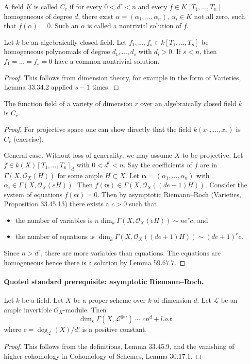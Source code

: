 \begin{definition}[59.67.5]
A field $K$ is called $C_r$ if for every $0<d^r<n$ and every $f\in K[T_1,\ldots,T_n]$ homogeneous of degree $d$, there exist $\alpha=(\alpha_1,\ldots,\alpha_n)$, $\alpha_i\in K$ not all zero, such that $f(\alpha)=0$. Such an $\alpha$ is called a nontrivial solution of $f$.
\end{definition}
\begin{lemma}[59.67.7]
Let $k$ be an algebraically closed field. Let $f_1,\ldots,f_s\in k[T_1,\ldots,T_n]$ be homogeneous polynomials of degree $d_1,\ldots,d_s$ with $d_i>0$. If $s<n$, then $f_1=\ldots=f_s=0$ have a common nontrivial solution.
\end{lemma}
\begin{proof}
This follows from dimension theory, for example in the form of Varieties, Lemma 33.34.2 applied $s-1$ times.
\end{proof}
\begin{theorem}
The function field of a variety of dimension $r$ over an algebraically closed field $k$ is $C_r$.
\end{theorem}
\begin{proof}
For projective space one can show directly that the field $k(x_1,\ldots,x_r)$ is $C_r$ (exercise).

General case. Without loss of generality, we may assume $X$ to be projective. Let $f\in k(X)[T_1,\ldots,T_n]_d$ with $0<d^r<n$. Say the coefficients of $f$ are in $\Gamma(X,\mathcal O_X(H))$ for some ample $H\subset X$. Let $\boldsymbol\alpha=(\alpha_1,\ldots,\alpha_n)$ with $\alpha_i\in\Gamma(X,\mathcal O_X(eH))$. Then $f(\boldsymbol\alpha)\in\Gamma(X,\mathcal O_X((de+1)H))$. Consider the system of equations $f(\boldsymbol\alpha)=0$. Then by asymptotic Riemann--Roch (Varieties, Proposition 33.45.13) there exists a $c>0$ such that
\begin{itemize}
\item the number of variables is $n\dim_k\Gamma(X,\mathcal O_X(eH))\sim ne^rc$, and
\item the number of equations is $\dim_k\Gamma(X,\mathcal O_X((de+1)H))\sim(de+1)^rc$.
\end{itemize}
Since $n>d^r$, there are more variables than equations. The equations are homogeneous hence there is a solution by Lemma 59.67.7.
\end{proof}
\paragraph{Quoted standard prerequisite: asymptotic Riemann--Roch.}
\begin{proposition}[33.45.13, Tag 0BJ8]
Let $k$ be a field. Let $X$ be a proper scheme over $k$ of dimension $d$. Let $\mathcal L$ be an ample invertible $\mathcal O_X$-module. Then
\[\dim_k\Gamma(X,\mathcal L^{\otimes n})\sim cn^d+l.o.t.\]
where $c=\deg_{\mathcal L}(X)/d!$ is a positive constant.
\end{proposition}
\begin{proof}
This follows from the definitions, Lemma 33.45.9, and the vanishing of higher cohomology in Cohomology of Schemes, Lemma 30.17.1.
\end{proof}
